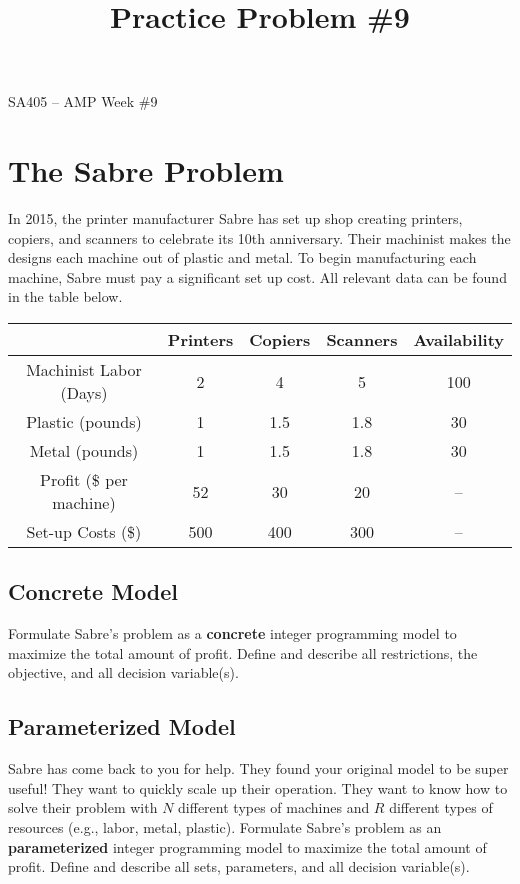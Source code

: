 \documentclass[11pt]{article}
\makeatletter
\theoremstyle{definition}
\renewcommand{\maketitle}{
  \noindent SA405 -- AMP \hfill Week \#9\\

  \begin{center}\Large{\textbf{\@title}}\end{center}
}
\makeatother
\begin{document}
  
\title{Practice Problem \#9}

\maketitle




\section{The Sabre Problem}
In 2015, the printer manufacturer Sabre has set up shop creating printers,
copiers, and scanners to celebrate its 10th anniversary. Their machinist makes the
designs each machine out of plastic and metal. To begin manufacturing each machine, Sabre must pay a significant set up cost. All relevant data can be found in the table below.

\begin{center}
\begin{tabular}{|c|c|c|c|c|} \hline
 & Printers & Copiers & Scanners & Availability\\ \hline
Machinist Labor (Days) & 2 & 4 & 5 & 100 \\ \hline
Plastic (pounds) & 1& 1.5 & 1.8 & 30 \\ \hline
Metal (pounds) & 1& 1.5 & 1.8 & 30 \\ \hline
Profit (\$ per machine) & 52 & 30 & 20 &-- \\ \hline
Set-up Costs (\$) & 500 & 400 & 300  & -- \\ \hline
\end{tabular}
\end{center}
\subsection{Concrete Model}
Formulate Sabre's problem as a \textbf{concrete} integer programming model to maximize the total amount of profit. Define and describe all restrictions, the objective, and all decision variable(s).
\pagebreak

\subsection{Parameterized Model}
Sabre has come back to you for help. They found your original model to be super useful! They want to quickly scale up their operation. They want to know how to solve their problem with $N$ different types of machines and $R$ different types of resources (e.g., labor, metal, plastic). Formulate Sabre's problem as an \textbf{parameterized} integer programming model to maximize the total amount of profit. Define and describe all sets, parameters, and all decision variable(s).
\newpage
\end{document}
